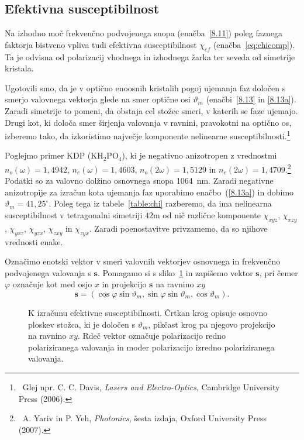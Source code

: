 \subsection*{Efektivna susceptibilnost}
Na izhodno moč frekvenčno podvojenega snopa (enačba~\ref{8.11}) 
poleg faznega faktorja bistveno vpliva tudi efektivna 
susceptibilnost $\chi_{ef}$ (enačba~\ref{eq:chicomp}). Ta je odvisna 
od polarizacij vhodnega in izhodnega žarka ter seveda od simetrije kristala. 

Ugotovili smo, da je v optično enoosnih kristalih pogoj ujemanja faz 
določen s smerjo valovnega vektorja glede na smer optične osi 
$\vartheta_m$ (enačbi~\ref{8.13} in \ref{8.13a}). Zaradi simetrije
to pomeni, da obstaja cel stožec smeri, v katerih se faze ujemajo.
Drugi kot, ki določa smer širjenja valovanja v ravnini, pravokotni na optično os, 
izberemo tako, da izkoristimo največje komponente nelinearne 
susceptibilnosti.\footnote{~Glej npr. C. C. Davis, {\it Lasers and Electro-Optics}, 
Cambridge University Press (2006).}

Poglejmo primer KDP (KH$_{2}$PO$_{4}$), ki je negativno anizotropen 
z vrednostmi $n_o(\omega) = 1,4942$, 
$n_e(\omega) = 1,4603$, $n_o(2\omega) = 1,5129$ in $n_e(2\omega) = 1,4709$.\footnote{~A. Yariv in 
P. Yeh, {\it Photonics}, šesta izdaja, Oxford University Press (2007).}
Podatki so za valovno dolžino osnovnega snopa 1064~nm. 
Zaradi negativne anizotropije za izračun kota ujemanja faz 
uporabimo enačbo~(\ref{8.13a}) in dobimo $\vartheta_m = 41,25^\circ$. 
Poleg tega iz tabele~\ref{table:chi} razberemo, da ima nelinearna susceptibilnost v tetragonalni
simetriji $\bar{4}2$m od nič različne komponente $\chi_{xyz}$, $\chi_{xzy}$, $\chi_{yxz}$,
$\chi_{yzx}$, $\chi_{zxy}$ in $\chi_{zyx}$.
Zaradi poenostavitve privzamemo, da so njihove vrednosti enake. 

Označimo enotski vektor v smeri valovnih vektorjev osnovnega in frekvenčno 
podvojenega valovanja s $\mathbf{s}$. Pomagamo si s sliko~\ref{fig:chi} in zapišemo 
vektor $\mathbf{s}$, pri čemer $\varphi$ označuje kot med osjo $x$ in projekcijo 
$\mathbf{s}$ na ravnino $xy$
\begin{equation}
\mathbf{s}=(\cos\varphi\sin\vartheta_m,\sin\varphi\sin\vartheta_m,\cos\vartheta_m).
\label{8.14}
\end{equation}

\begin{figure}[ht]
\centering
\def\svgwidth{80truemm} 

\caption{K izračunu efektivne susceptibilnosti. Črtkan krog opisuje osnovno ploskev
stožca, ki je določen s $\vartheta_m$, pikčast krog pa njegovo projekcijo
na ravnino $xy$. Rdeč vektor označuje polarizacijo redno polariziranega valovanja in
moder polarizacijo izredno polariziranega valovanja.}
\label{fig:chi}
\end{figure}

